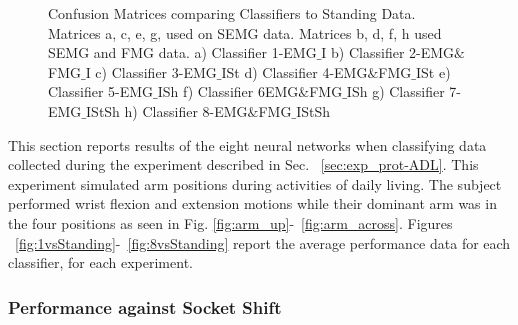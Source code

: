 \documentclass[twocolumn]{sagej}
\begin{document}
\begin{figure*}[htbp]
\centering
{}
\caption{Confusion Matrices comparing Classifiers to Standing Data. Matrices a, c, e, g, used on SEMG data. Matrices b, d, f, h used SEMG and FMG data. a) Classifier 1-EMG$\_$I b) Classifier 2-EMG$\&$FMG$\_$I c) Classifier 3-EMG$\_$ISt d) Classifier 4-EMG$\&$FMG$\_$ISt e) Classifier 5-EMG$\_$ISh f) Classifier 6EMG$\&$FMG$\_$ISh g) Classifier 7-EMG$\_$IStSh h) Classifier 8-EMG$\&$FMG$\_$IStSh}

\end{figure*}

This section reports results of the eight neural networks when classifying data collected during the experiment described in Sec. ~\ref{sec:exp_prot-ADL}.  This experiment simulated arm positions during activities of daily living.  The subject performed wrist flexion and extension motions while their dominant arm was in the four positions as seen in Fig. \ref{fig:arm_up}-~\ref{fig:arm_across}.  Figures ~\ref{fig:1vsStanding}-~\ref{fig:8vsStanding} report the average performance data for each classifier, for each experiment.  \par \noindent

\subsubsection{Performance against Socket Shift}
\label{sec:res_shift}

\begin{comment}
Data comparing different training data sets to shift

ideal, standing, shift -> shift
ideal, shift -> shift
ideal, standing -> shift
ideal -> shift
\end{comment}
\end{document}
